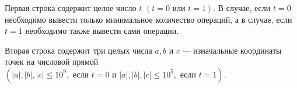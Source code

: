 Первая строка содержит целое число $t$ $( t = 0 \text{ или } t = 1)$. В случае, если $t = 0$ необходимо вывести только минимальное количество операций, а в случае, если $t = 1$ необходимо также вывести сами операции.

Вторая строка содержит три целых числа $a,b$ и $c$ --- изначальные координаты точек на числовой прямой $(|a|, |b|, |c| \leq 10^9, \text{ если } t = 0 \text{ и } |a|, |b|, |c| \leq 10^5,  \text{ если } t = 1)$. 